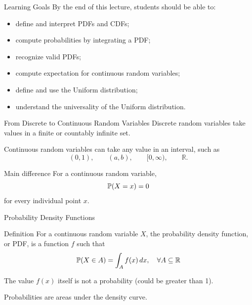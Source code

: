 \setcounter{framenumber}{0}

\begin{frame}
  \titlepage
\end{frame}

\begin{frame}{Learning Goals}
By the end of this lecture, students should be able to:
\begin{itemize}
    \item define and interpret PDFs and CDFs;
    \item compute probabilities by integrating a PDF;
    \item recognize valid PDFs;
    \item compute expectation for continuous random variables;
    \item define and use the Uniform distribution;
    \item understand the universality of the Uniform distribution.
\end{itemize}
\end{frame}


\begin{frame}{From Discrete to Continuous Random Variables}
Discrete random variables take values in a finite or countably infinite set.

\vspace{0.25cm}

Continuous random variables can take any value in an interval, such as
\[
(0,1),\qquad (a,b),\qquad [0,\infty),\qquad \mathbb{R}.
\]

\vspace{0.25cm}

\begin{keybox}{Main difference}
For a continuous random variable,
\[
\mathbb{P}(X=x)=0
\]
for every individual point $x$.
\end{keybox}
\end{frame}

\begin{frame}{Probability Density Functions}
\begin{keybox}{Definition}
For a continuous random variable $X$, the probability density function, or PDF, is a function $f$ such that
\[
\mathbb{P}(X\in A)=\int_A f(x)\,dx, \quad \forall A\subseteq \mathbb{R}
\]
\end{keybox}

\vspace{0.25cm}

The value $f(x)$ itself is not a probability (could be greater than 1).

\vspace{0.25cm}

Probabilities are areas under the density curve.
\end{frame}

